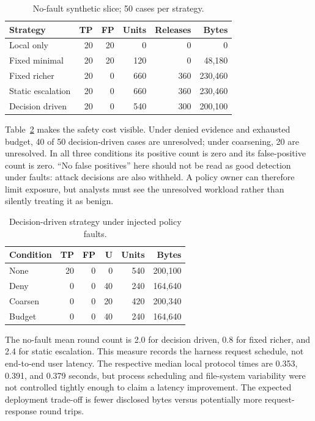 \documentclass[conference,letterpaper]{IEEEtran}
\begin{document}
\begin{table}[t]
\centering\caption{No-fault synthetic slice; 50 cases per strategy.}
\label{tab:nofault}\scriptsize
\begin{tabular}{lrrrrr}\hline
Strategy & TP & FP & Units & Releases & Bytes \\\hline
Local only &20&20&0&0&0\\
Fixed minimal &20&20&120&0&48,180\\
Fixed richer &20&0&660&360&230,460\\
Static escalation &20&0&660&360&230,460\\
Decision driven &20&0&540&300&200,100\\\hline
\end{tabular}
\end{table}

Table~\ref{tab:faults} makes the safety cost visible. Under denied evidence and exhausted budget, 40 of 50 decision-driven cases are unresolved; under coarsening, 20 are unresolved. In all three conditions its positive count is zero and its false-positive count is zero. ``No false positives'' here should not be read as good detection under faults: attack decisions are also withheld. A policy owner can therefore limit exposure, but analysts must see the unresolved workload rather than silently treating it as benign.

\begin{table}[t]
\centering\caption{Decision-driven strategy under injected policy faults.}
\label{tab:faults}\scriptsize
\begin{tabular}{lrrrrr}\hline
Condition & TP & FP & U & Units & Bytes \\\hline
None &20&0&0&540&200,100\\
Deny &0&0&40&240&164,640\\
Coarsen &0&0&20&420&200,340\\
Budget &0&0&40&240&164,640\\\hline
\end{tabular}
\end{table}

The no-fault mean round count is 2.0 for decision driven, 0.8 for fixed richer, and 2.4 for static escalation. This measure records the harness request schedule, not end-to-end user latency. The respective median local protocol times are 0.353, 0.391, and 0.379 seconds, but process scheduling and file-system variability were not controlled tightly enough to claim a latency improvement. The expected deployment trade-off is fewer disclosed bytes versus potentially more request-response round trips.
\end{document}
